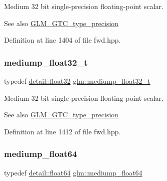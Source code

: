 Medium 32 bit single-\/precision floating-\/point scalar. \begin{DoxySeeAlso}{See also}
\hyperlink{group__gtc__type__precision}{G\+L\+M\+\_\+\+G\+T\+C\+\_\+type\+\_\+precision} 
\end{DoxySeeAlso}


Definition at line 1404 of file fwd.\+hpp.

\mbox{\label{group__gtc__type__precision_gacbd406715148db96c9d9d2a2ef6460de}} 
\subsubsection{\texorpdfstring{mediump\+\_\+float32\+\_\+t}{mediump\_float32\_t}}
{\footnotesize\ttfamily typedef \hyperlink{namespaceglm_1_1detail_ad60558c5c304624de0b54c51b5857737}{detail\+::float32} \hyperlink{group__gtc__type__precision_gacbd406715148db96c9d9d2a2ef6460de}{glm\+::mediump\+\_\+float32\+\_\+t}}

Medium 32 bit single-\/precision floating-\/point scalar. \begin{DoxySeeAlso}{See also}
\hyperlink{group__gtc__type__precision}{G\+L\+M\+\_\+\+G\+T\+C\+\_\+type\+\_\+precision} 
\end{DoxySeeAlso}


Definition at line 1412 of file fwd.\+hpp.

\mbox{\label{group__gtc__type__precision_ga9225ae6aed0f90b6eb65bf8d466199c1}} 
\subsubsection{\texorpdfstring{mediump\+\_\+float64}{mediump\_float64}}
{\footnotesize\ttfamily typedef \hyperlink{namespaceglm_1_1detail_a5a0a9a1be3fd5dbe6d47ae45c3022b06}{detail\+::float64} \hyperlink{group__gtc__type__precision_ga9225ae6aed0f90b6eb65bf8d466199c1}{glm\+::mediump\+\_\+float64}}

